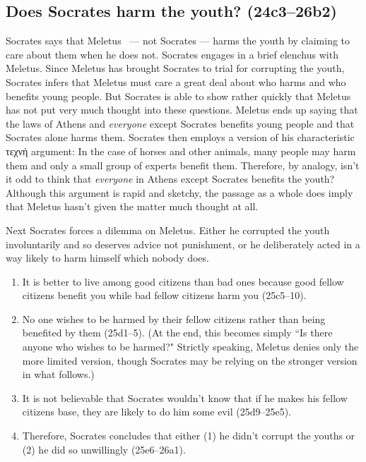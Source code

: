 \documentclass[11pt]{article}
\begin{document}
\subsection{Does Socrates harm the youth? (24c3--26b2)}

Socrates says that Meletus ~--- not Socrates --- harms the youth by
claiming to care about them when he does not. Socrates engages in a brief
elenchus with Meletus.  Since Meletus has brought Socrates to trial for
corrupting the youth, Socrates infers that Meletus must care a great deal
about who harms and who benefits young people. But Socrates is able to show
rather quickly that Meletus has not put very much thought into these
questions.  Meletus ends up saying that the laws of Athens and
\emph{everyone} except Socrates benefits young people and that Socrates
alone harms them.  Socrates then employs a version of his characteristic
τεχνή argument: In the case of horses and other animals, many people may
harm them and only a small group of experts benefit them. Therefore, by
analogy, isn't it odd to think that \emph{everyone} in Athens except
Socrates benefits the youth?  Although this argument is rapid and sketchy,
the passage as a whole does imply that Meletus hasn't given the matter much
thought at all.

Next Socrates forces a dilemma on Meletus. Either he corrupted the youth
involuntarily and so deserves advice not punishment, or he deliberately
acted in a way likely to harm himself which nobody does.

\begin{enumerate}
    \item It is better to live among good citizens than bad ones because
        good fellow citizens benefit you while bad fellow citizens harm
        you (25c5--10).
    \item No one wishes to be harmed by their fellow citizens rather than
        being benefited by them (25d1--5). (At the end, this becomes simply
        ``Is there anyone who wishes to be harmed?" Strictly speaking,
        Meletus denies only the more limited version, though Socrates may
        be relying on the stronger version in what follows.)
    \item It is not believable that Socrates wouldn't know that if he makes
        his fellow citizens base, they are likely to do him some evil
        (25d9--25e5).
    \item Therefore, Socrates concludes that either (1) he didn't corrupt
        the youths or (2) he did so unwillingly (25e6--26a1).
\end{enumerate}
\end{document}
